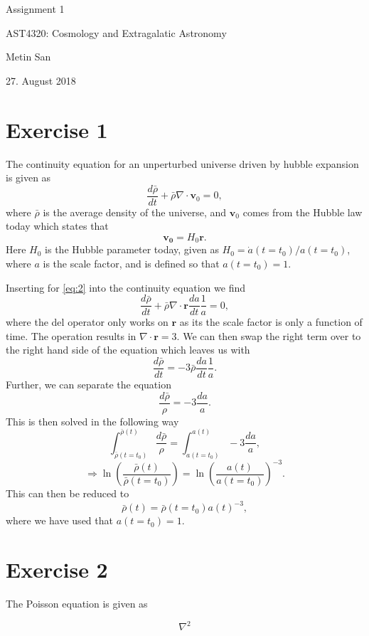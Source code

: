 \documentclass[a4paper,11.5pt,]{article}
\begin{document}
\vspace*{2cm}
\begin{center} 
 
\huge{Assignment 1}

\vspace{15mm}

\large{AST4320: Cosmology and Extragalatic Astronomy}

\vspace{5mm}

\normalsize{Metin San}

\vspace{5mm}

\normalsize{27. August 2018}

\vspace{25mm}

\end{center}

\newpage
\section*{Exercise 1}

The continuity equation for an unperturbed universe driven by hubble expansion is given as 
\begin{equation}\label{eq:1}
\frac{d\bar{\rho}}{dt} + \bar{\rho} \nabla \cdot \mathbf{v}_0 = 0,
\end{equation}
where $\bar{\rho}$ is the average density of the universe, and $\mathbf{v}_0$ comes from the Hubble law today which states that 
\begin{equation}\label{eq:2}
\mathbf{v_0} = H_0 \mathbf{r}.
\end{equation}
Here $H_0$ is the Hubble parameter today, given as $H_0 = \dot{a}(t=t_0) / a(t = t_0)$, where $a$ is the scale factor, and is defined so that $a(t= t_0) = 1$. 

Inserting for \eqref{eq:2} into the continuity equation we find
\[
\frac{d\bar{\rho}}{dt} + \bar{\rho} \nabla \cdot \mathbf{r}  \frac{da}{dt} \frac{1}{a}= 0,
\]
where the del operator only works on $\mathbf{r}$ as its the scale factor is only a function of time. The operation results in $\nabla \cdot \mathbf{r} = 3$. We can then swap the right term over to the right hand side of the equation which leaves us with
\[
\frac{d\bar{\rho}}{dt}  = - 3\bar{\rho}\frac{da}{dt} \frac{1}{a}.
\]
Further, we can separate the equation
\[
\frac{d\bar{\rho}}{\rho} = -3 \frac{da}{a}.
\]
This is then solved in the following way
\[
\int_{\bar{\rho}(t=t_0)}^{\bar{\rho}(t)} \frac{d\bar{\rho}}{\rho} = \int_{a(t=t_0)}^{a(t)} -3 \frac{da}{a},
\]
\[
\Rightarrow \ln \left( \frac{\bar{\rho}(t)}{\bar{\rho}(t=t_0)}\right) = \ln \left( \frac{a(t)}{a(t=t_0)}\right)^{-3}.
\]
This can then be reduced to
\begin{equation}\label{eq:3}
\bar{\rho}(t) = \bar{\rho}(t=t_0)a(t)^{-3},
\end{equation}
where we have used that $a(t=t_0) = 1$.


\section*{Exercise 2}

The Poisson equation is given as

\begin{equation}\label{eq:4}
\nabla^2
\end{equation}
\end{document}
